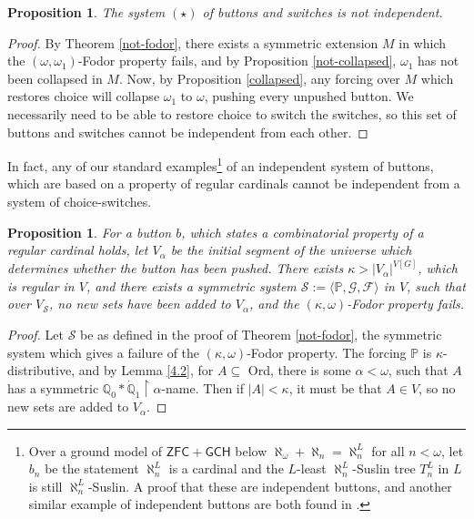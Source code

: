 \documentclass[a4paper,11pt]{amsart}
\newtheorem{prop}[theorem]{Proposition}
\theoremstyle{definition}
\newcommand{\Q}{\mathbb{Q}} %
\newcommand{\p}{\mathbb{P}}
\newcommand{\ZFC}{\mathsf{ZFC}}
\newcommand{\GCH}{\mathsf{GCH}}
\begin{document}
\begin{prop}
    The system $(\star)$ of buttons and switches is not independent. 
\end{prop}

\begin{proof}
    By Theorem \ref{not-fodor}, there exists a symmetric extension $M$ in which the $(\omega, \omega_1)$-Fodor property fails, and by Proposition \ref{not-collapsed}, $\omega_1$ has not been collapsed in $M$. Now, by Proposition \ref{collapsed}, any forcing over $M$ which restores choice will collapse $\omega_1$ to $\omega$, pushing every unpushed button. We necessarily need to be able to restore choice to switch the switches, so this set of buttons and switches cannot be independent from each other.
\end{proof}

In fact, any of our standard examples\footnote{Over a ground model of $\ZFC + \GCH$ below $\aleph_\omega + \aleph_n = \aleph_n^L$ for all $n<\omega$, let $b_n$ be the statement $\aleph_n^L$ is a cardinal and the $L$-least $\aleph^L_n$-Suslin tree $T^L_n$ in $L$ is still $\aleph^L_n$-Suslin. A proof that these are independent buttons, and another similar example of independent buttons are both found in \cite{Friedman-multiverse}. } of an independent system of buttons, which are based on a property of regular cardinals cannot be independent from a system of choice-switches. 

\begin{prop}\label{all-buttons:prop}
    For a button $b$, which states a combinatorial property of a regular cardinal holds, let $V_\alpha$ be the initial segment of the universe which determines whether the button has been pushed. There exists $\kappa > |V_\alpha|^{V[G]}$, which is regular in $V$, and there exists a symmetric system $\mathscr{S} := \langle\p, \mathscr{G}, \mathscr{F}\rangle$ in $V$, such that over $V_\mathscr{S}$, no new sets have been added to $V_\alpha$, and the $(\kappa,\omega)$-Fodor property fails. 
\end{prop}

\begin{proof}
    Let $\mathscr{S}$ be as defined in the proof of Theorem \ref{not-fodor}, the symmetric system which gives a failure of the $(\kappa,\omega)$-Fodor property. The forcing  $\p$ is $\kappa$-distributive, and  by Lemma \ref{4.2}, for $A \subseteq$ Ord, there is some $\alpha<\omega$, such that $A$ has a symmetric $\Q_0 \ast \dot{\Q}_1 \restriction \alpha$-name. Then if $|A| < \kappa$, it must be that $A \in V$, so no new sets are added to $V_\alpha$. 
\end{proof}
\end{document}
